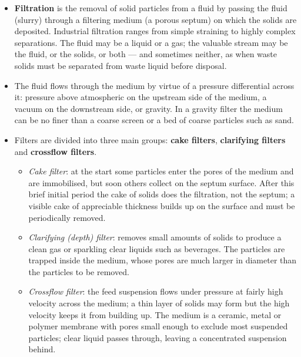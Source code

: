 \documentclass[10pt,a4paper]{article}
\newcommand{\spsub}[1]{\par\addvspace{7pt}\noindent{\color{accent}\bfseries #1}\par\addvspace{3pt}\nopagebreak}
\begin{document}
\spsub{Definition, driving force, classification}
\begin{itemize}
  \item \textbf{Filtration} is the removal of solid particles from a fluid by passing the fluid (slurry) through a filtering medium (a porous septum) on which the solids are deposited. Industrial filtration ranges from simple straining to highly complex separations. The fluid may be a liquid or a gas; the valuable stream may be the fluid, or the solids, or both --- and sometimes neither, as when waste solids must be separated from waste liquid before disposal.
  \item The fluid flows through the medium by virtue of a pressure differential across it: pressure above atmospheric on the upstream side of the medium, a vacuum on the downstream side, or gravity. In a gravity filter the medium can be no finer than a coarse screen or a bed of coarse particles such as sand.
  \item Filters are divided into three main groups: \textbf{cake filters}, \textbf{clarifying filters} and \textbf{crossflow filters}.
  \begin{itemize}
    \item \emph{Cake filter}: at the start some particles enter the pores of the medium and are immobilised, but soon others collect on the septum surface. After this brief initial period the cake of solids does the filtration, not the septum; a visible cake of appreciable thickness builds up on the surface and must be periodically removed.
    \item \emph{Clarifying (depth) filter}: removes small amounts of solids to produce a clean gas or sparkling clear liquids such as beverages. The particles are trapped inside the medium, whose pores are much larger in diameter than the particles to be removed.
    \item \emph{Crossflow filter}: the feed suspension flows under pressure at fairly high velocity across the medium; a thin layer of solids may form but the high velocity keeps it from building up. The medium is a ceramic, metal or polymer membrane with pores small enough to exclude most suspended particles; clear liquid passes through, leaving a concentrated suspension behind.
  \end{itemize}
\end{itemize}
\end{document}
